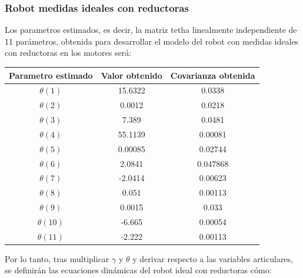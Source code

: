 	\subsubsection{Robot medidas ideales con reductoras}
	Los parametros estimados, es decir, la matriz tetha linealmente independiente de 11 parámetros, obtenida para desarrollar el modelo del robot con medidas ideales con reductoras en los motores será:
	\begin{center}
		\begin{tabular}{| c | c | c |}

			\hline
			Parametro estimado & Valor obtenido & Covarianza obtenida \\
			\hline
			$\theta(1) $ & 15.6322 & 0.0338 \\
			\hline
			$\theta(2) $ & 0.0012 & 0.0218 \\
			\hline
			$\theta(3) $ & 7.389 & 0.0481 \\
			\hline
			$\theta(4) $ & 55.1139 & 0.00081 \\
			\hline
			$\theta(5) $ & 0.00085 & 0.02744 \\
			\hline
			$\theta(6) $ & 2.0841 & 0.047868 \\
			\hline
			$\theta(7) $ & -2.0414 & 0.00623 \\
			\hline
			$\theta(8) $ & 0.051 & 0.00113 \\
			\hline
			$\theta(9) $ & 0.0015 & 0.033 \\
			\hline
			$\theta(10) $ & -6.665 & 0.00054 \\
			\hline
			$\theta(11) $ & -2.222 & 0.00113 \\
			\hline


		\end{tabular}
	\end{center}
Por lo tanto, tras multiplicar $\gamma$ y $\theta$ y derivar respecto a las variables articulares, se definirán las ecuaciones dinámicas del robot ideal con reductoras cómo:\\
